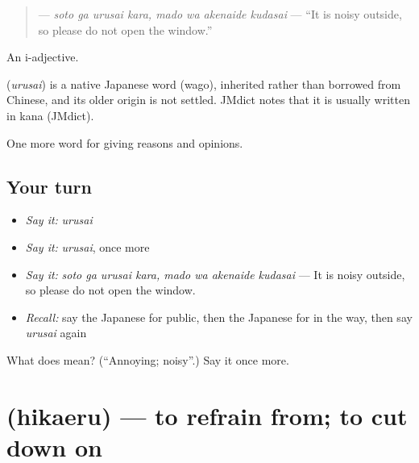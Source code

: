 \begin{quote}
\textbf{   } — \emph{soto ga urusai kara, mado wa akenaide kudasai} — \textquotedblleft{}It is noisy outside, so please do not open the window.\textquotedblright{}
\end{quote}

An i-adjective.

\begin{cousinweb}
\textbf{} (\emph{urusai}) is a native Japanese word (wago), inherited rather than borrowed from Chinese, and its older origin is not settled. JMdict notes that it is usually written in kana (JMdict).
\end{cousinweb}

\begin{grammarlens}[title={What you've built}]
One more word for giving reasons and opinions.
\end{grammarlens}

\subsection*{Your turn}
\begin{itemize}
\raggedright
  \item \emph{Say it:} \emph{urusai}
  \item \emph{Say it:} \emph{urusai}, once more
  \item \emph{Say it:} \emph{soto ga urusai kara, mado wa akenaide kudasai} — It is noisy outside, so please do not open the window.
  \item \emph{Recall:} say the Japanese for public, then the Japanese for in the way, then say \emph{urusai} again
\end{itemize}

\begin{tcolorbox}[breakable,colback=teal!4,colframe=teal!35!black,title={Before you move on}]
What does  mean? (\textquotedblleft{}Annoying; noisy\textquotedblright{}.) Say it once more.
\end{tcolorbox}
\section[\texorpdfstring{\ja{ひかえる} (hikaeru)}{ひかえる (hikaeru)}]{ (hikaeru) — to refrain from; to cut down on}

\label{lesson:JA-C328-hikaeru}




